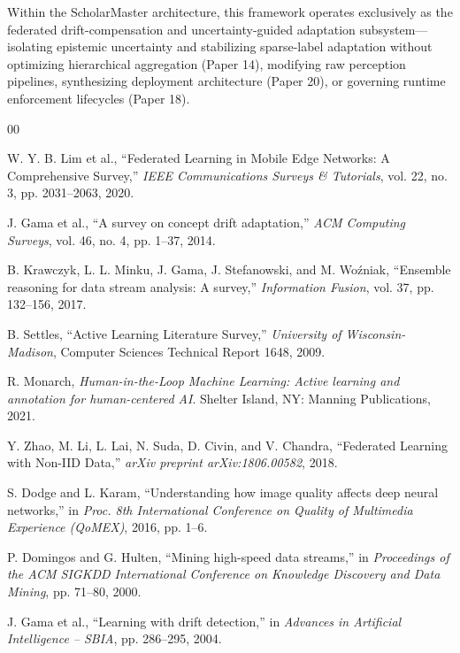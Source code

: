 \documentclass[conference]{IEEEtran}
\begin{document}
Within the ScholarMaster architecture, this framework operates exclusively as the federated drift-compensation and uncertainty-guided adaptation subsystem---isolating epistemic uncertainty and stabilizing sparse-label adaptation without optimizing hierarchical aggregation (Paper 14), modifying raw perception pipelines, synthesizing deployment architecture (Paper 20), or governing runtime enforcement lifecycles (Paper 18).

\begin{thebibliography}{00}

 W. Y. B. Lim et al., ``Federated Learning in Mobile Edge Networks: A Comprehensive Survey,'' \textit{IEEE Communications Surveys \& Tutorials}, vol. 22, no. 3, pp. 2031--2063, 2020.

 J. Gama et al., ``A survey on concept drift adaptation,'' \textit{ACM Computing Surveys}, vol. 46, no. 4, pp. 1--37, 2014.

 B. Krawczyk, L. L. Minku, J. Gama, J. Stefanowski, and M. Wo\'{z}niak, ``Ensemble reasoning for data stream analysis: A survey,'' \textit{Information Fusion}, vol. 37, pp. 132--156, 2017.

 B. Settles, ``Active Learning Literature Survey,'' \textit{University of Wisconsin-Madison}, Computer Sciences Technical Report 1648, 2009.

 R. Monarch, \textit{Human-in-the-Loop Machine Learning: Active learning and annotation for human-centered AI}. Shelter Island, NY: Manning Publications, 2021.

 Y. Zhao, M. Li, L. Lai, N. Suda, D. Civin, and V. Chandra, ``Federated Learning with Non-IID Data,'' \textit{arXiv preprint arXiv:1806.00582}, 2018.

 S. Dodge and L. Karam, ``Understanding how image quality affects deep neural networks,'' in \textit{Proc. 8th International Conference on Quality of Multimedia Experience (QoMEX)}, 2016, pp. 1--6.

 P. Domingos and G. Hulten, ``Mining high-speed data streams,'' in \textit{Proceedings of the ACM SIGKDD International Conference on Knowledge Discovery and Data Mining}, pp. 71--80, 2000.

 J. Gama et al., ``Learning with drift detection,'' in \textit{Advances in Artificial Intelligence -- SBIA}, pp. 286--295, 2004.


\end{thebibliography}
\end{document}
